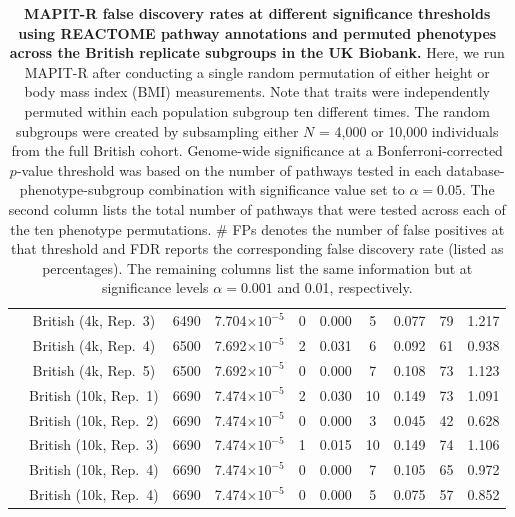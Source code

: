 \documentclass[10pt]{article}
\begin{document}
\begin{landscape}
\begin{table}[ht]
\begin{tabular}{|c|c|c|ccc|cc|cc|}
  & British (4k, Rep.~3) & 6490 & 7.704$\times 10^{-5}$ & 0 & 0.000 & 5 & 0.077 & 79 & 1.217 \\
  & British (4k, Rep.~4) & 6500 & 7.692$\times 10^{-5}$ & 2 & 0.031 & 6 & 0.092 & 61 & 0.938 \\
  & British (4k, Rep.~5) & 6500 & 7.692$\times 10^{-5}$ & 0 & 0.000 & 7 & 0.108 & 73 & 1.123 \\
  & British (10k, Rep.~1) & 6690 & 7.474$\times 10^{-5}$ & 2 & 0.030 & 10 & 0.149 & 73 & 1.091 \\
  & British (10k, Rep.~2) & 6690 & 7.474$\times 10^{-5}$ & 0 & 0.000 & 3 & 0.045 & 42 & 0.628 \\
  & British (10k, Rep.~3) & 6690 & 7.474$\times 10^{-5}$ & 1 & 0.015 & 10 & 0.149 & 74 & 1.106 \\
  & British (10k, Rep.~4) & 6690 & 7.474$\times 10^{-5}$ & 0 & 0.000 & 7 & 0.105 & 65 & 0.972 \\
  & British (10k, Rep.~4) & 6690 & 7.474$\times 10^{-5}$ & 0 & 0.000 & 5 & 0.075 & 57 & 0.852 \\
    \hline
\end{tabular}
\caption{\textbf{MAPIT-R false discovery rates at different significance thresholds using REACTOME pathway annotations and permuted phenotypes across the British replicate subgroups in the UK Biobank.} Here, we run MAPIT-R after conducting a single random permutation of either height or body mass index (BMI) measurements. Note that traits were independently permuted within each population subgroup ten different times. The random subgroups were created by subsampling either $N$ = 4,000 or 10,000 individuals from the full British cohort. Genome-wide significance at a Bonferroni-corrected $p$-value threshold was based on the number of pathways tested in each database-phenotype-subgroup combination with significance value set to $\alpha = 0.05$. The second column lists the total number of pathways that were tested across each of the ten phenotype permutations. \# FPs denotes the number of false positives at that threshold and FDR reports the corresponding false discovery rate (listed as percentages). The remaining columns list the same information but at significance levels $\alpha = 0.001$ and 0.01, respectively.}
\label{InterPath-Supp-Table-BritReps-FDRs-pt2}
\end{table}

\end{landscape}
\end{document}
